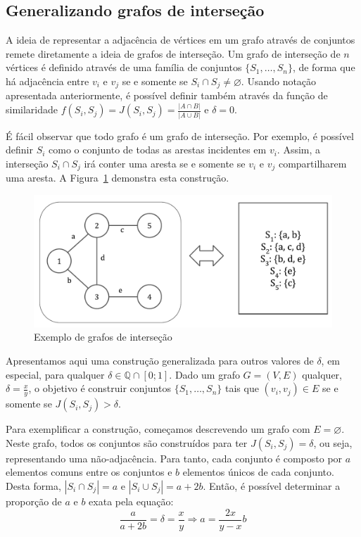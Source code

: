\subsection{Generalizando grafos de interseção}

A ideia de representar a adjacência de vértices em um grafo através de conjuntos remete diretamente a ideia de grafos de interseção. Um grafo de interseção de $n$ vértices é definido através de uma família de conjuntos $\{S_1, \ldots, S_n\}$, de forma que há adjacência entre $v_i$ e $v_j$ se e somente se $S_i \cap S_j \neq \varnothing$. Usando notação apresentada anteriormente, é possível definir também através da função de similaridade $f(S_i, S_j) = J(S_i, S_j) = \frac{|A \cap B|}{|A \cup B|}$ e $\delta = 0$.

É fácil observar que todo grafo é um grafo de interseção. Por exemplo, é possível definir $S_i$ como o conjunto de todas as arestas incidentes em $v_i$. Assim, a interseção $S_i \cap S_j$ irá conter uma aresta se e somente se $v_i$ e $v_j$ compartilharem uma aresta. A Figura~\ref{fig:graph_intersection} demonstra esta construção.

\begin{figure}[!htbp]
  \centering
  \includegraphics[scale=0.6]{figures/graphs_intersection.pdf}
  \caption{Exemplo de grafos de interseção}
  \label{fig:graph_intersection}
\end{figure}

Apresentamos aqui uma construção generalizada para outros valores de $\delta$, em especial, para qualquer $\delta \in \mathbb{Q} \cap [0;1]$. Dado um grafo $G = (V, E)$ qualquer, $\delta = \frac{x}{y}$, o objetivo é construir conjuntos $\{S_1, \ldots, S_n\}$ tais que $(v_i, v_j) \in E$ se e somente se $J(S_i, S_j) > \delta$.

Para exemplificar a construção, começamos descrevendo um grafo com $E = \varnothing$. Neste grafo, todos os conjuntos são construídos para ter $J(S_i, S_j) = \delta$, ou seja, representando uma não-adjacência. Para tanto, cada conjunto é composto por $a$ elementos comuns entre os conjuntos e $b$ elementos únicos de cada conjunto. Desta forma, $|S_i \cap S_j| = a$ e $|S_i \cup S_j| = a + 2b$. Então, é possível determinar a proporção de $a$ e $b$ exata pela equação:
\[
    \frac{a}{a+2b} = \delta = \frac{x}{y} \Rightarrow a = \frac{2x}{y-x}b
\]

